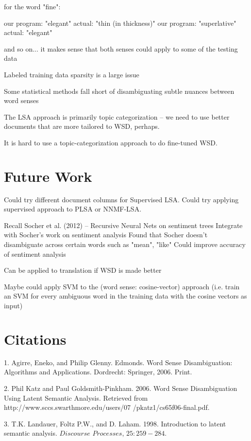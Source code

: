 \documentclass[10pt, letterpaper]{article}
\begin{document}
	for the word "fine": 	

	our program: "elegant"  actual: "thin (in thickness)"
	our program: "superlative" actual: "elegant" 	

	and so on... it makes sense that both senses could apply to some of the testing data

	Labeled training data sparsity is a large issue

	Some statistical methods fall short of disambiguating subtle nuances between word senses	

	The LSA approach is primarily topic categorization -- we need to use better documents that are more tailored to WSD, perhaps. 	

	It is hard to use a topic-categorization approach to do fine-tuned WSD. 

	\section{Future Work}
	Could try different document columns for Supervised LSA.
	Could try applying supervised approach to PLSA or NNMF-LSA.	

	Recall Socher et al. (2012) -- Recursive Neural Nets on sentiment trees
	Integrate with Socher's work on sentiment analysis
	Found that Socher doesn't disambiguate across certain words such as "mean", "like"
	Could improve accuracy of sentiment analysis	

	Can be applied to translation if WSD is made better

	Maybe could apply SVM to the (word sense: cosine-vector) approach (i.e. train an SVM 
	for every ambiguous word in the training data with the cosine vectors as input)

	\section{Citations} 

	1. Agirre, Eneko, and Philip Glenny. Edmonds. Word Sense Disambiguation: Algorithms and Applications. Dordrecht: Springer, 2006. Print.

	2. Phil Katz and Paul Goldsmith-Pinkham. 2006. Word Sense Disambiguation Using Latent Semantic Analysis. 
	   Retrieved from http://www.sccs.swarthmore.edu/users/07 /pkatz1/cs65f06-final.pdf.

	3. T.K. Landauer, Foltz P.W., and D. Laham. 1998. Introduction to latent semantic analysis. $\textit{Discourse Processes}$, $25:259-284$. 

 
\end{document}
